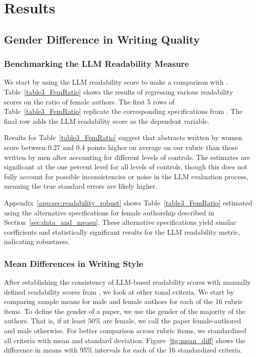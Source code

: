 \section{Results}\label{sec:results}

\subsection{Gender Difference in Writing Quality}\label{sec:Gen_Diff_Results}

\subsubsection{Benchmarking the LLM Readability Measure}\label{sec:benchmark_llm}

We start by using the LLM readability score to make a comparison with  \cite{hengel2022publishing}. Table~\ref{table3_FemRatio} shows the results of regressing various readability scores on the ratio of female authors. The first 5 rows of Table~\ref{table3_FemRatio} replicate the corresponding specifications from \textcite{hengel2022publishing}. The final row adds the LLM readability score as the dependent variable.



Results for Table~\ref{table3_FemRatio} suggest that abstracts written by women score between 0.27 and 0.4 points higher on average on our rubric than those written by men after accounting for different levels of controls. The estimates are significant at the one percent level for all levels of controls, though this does not fully account for possible inconsistencies or noise in the LLM evaluation process, meaning the true standard errors are likely higher.

Appendix~\ref{app:sec:readability_robust} shows Table~\ref{table3_FemRatio} estimated using the alternative specifications for female authorship described in Section~\ref{sec:data_and_measu}. These alternative specifications yield similar coefficients and statistically significant results for the LLM readability metric, indicating robustness.

\subsubsection{Mean Differences in Writing Style}

After establishing the consistency of LLM-based readability scores with manually defined readability scores from \textcite{hengel2022publishing}, we look at other tonal criteria. We start by comparing sample means for male and female authors for each of the 16 rubric items. To define the gender of a paper, we use the gender of the majority of the authors. That is, if at least 50\% are female, we call the paper female-authored and male otherwise. For better comparison across rubric items, we standardized all criteria with mean and standard deviation. Figure~\ref{fig:mean_diff} shows the difference in means with 95\% intervals for each of the 16 standardized criteria. 


